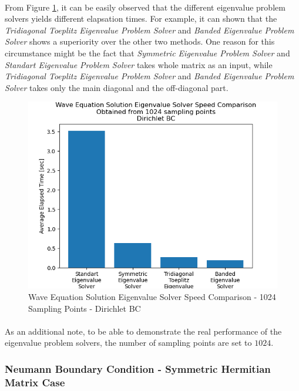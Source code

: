 \documentclass[letterpaper,12pt]{article}
\begin{document}
\paragraph{} From Figure \ref{fig:3_1024_d_eigen_solver_speed}, it can be easily observed that the different eigenvalue problem solvers yields different elapsation times. For example, it can shown that the \textit{Tridiagonal Toeplitz Eigenvalue Problem Solver} and \textit{Banded Eigenvalue Problem Solver} shows a superiority over the other two methods. One reason for this circumstance might be the fact that \textit{Symmetric Eigenvalue Problem Solver} and \textit{Standart Eigenvalue Problem Solver} takes whole matrix as an input, while \textit{Tridiagonal Toeplitz Eigenvalue Problem Solver} and \textit{Banded Eigenvalue Problem Solver} takes only the main diagonal and the off-diagonal part.
\label{sec:speed}
\begin{figure}[H]
\centerline{\includegraphics[width=\linewidth]{figures/3_1024_d_eigen_solver_speed.png}}
\caption{Wave Equation Solution Eigenvalue Solver Speed Comparison - 1024 Sampling Points - Dirichlet BC}
\label{fig:3_1024_d_eigen_solver_speed}
\end{figure}

\paragraph{} As an additional note, to be able to demonstrate the real performance of the eigenvalue problem solvers, the number of sampling points are set to $1024$.

\subsubsection{Neumann Boundary Condition - Symmetric Hermitian Matrix Case}
\end{document}
